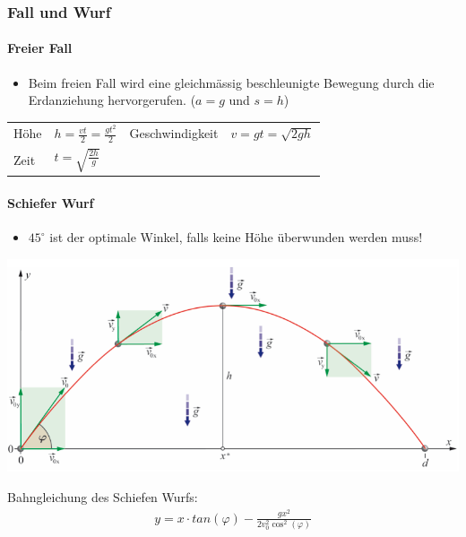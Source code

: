 
\subsubsection{Fall und Wurf}

\paragraph{Freier Fall}
\begin{itemize}
	\item Beim freien Fall wird eine gleichmässig beschleunigte Bewegung durch die Erdanziehung hervorgerufen. ($a = g$ und $s = h$)
\end{itemize}
\begin{tabbing}
	\begin{tabu} to \linewidth {l X l X}
		\toprule
		Höhe & $h = \frac{vt}{2} = \frac{gt^2}{2}$  &
		Geschwindigkeit & $v = gt = \sqrt{2gh}$ \\
		Zeit & $t = \sqrt{\frac{2h}{g}}$ & & \\
		\bottomrule
	\end{tabu}
\end{tabbing}


\paragraph{Schiefer Wurf}

\begin{itemize}
	\item $45^\circ$ ist der optimale Winkel, falls keine Höhe überwunden werden muss!
\end{itemize}

\begin{minipage}[h!]{0.6\linewidth}
	\includegraphics[width=0.9\linewidth]{images/schiefer_wurf}
\end{minipage}
\hfill
\begin{minipage}[h!]{0.4\linewidth}
Bahngleichung des Schiefen Wurfs: 
\begin{align*}
y = x \cdot tan(\varphi) - \frac{g x^2}{2 v_0^2 \cos^2(\varphi)}
\end{align*}
\end{minipage}

